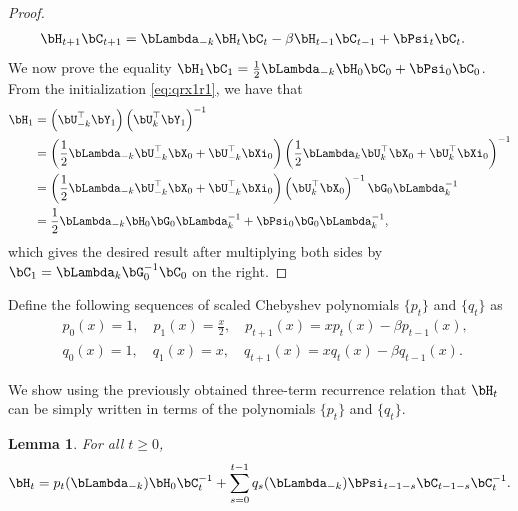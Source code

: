 \documentclass{article}
\theoremstyle{plain}
\newtheorem{lemma}[theorem]{Lemma}
\theoremstyle{definition}
\theoremstyle{remark}
\begin{document}
\begin{proof}
  \begin{align*}
    \bH_{t+1}\bC_{t+1} & = \bLambda_{-k} \bH_t \bC_t - \beta \bH_{t-1} \bC_{t-1} + \bPsi_t \bC_t.
  \end{align*}
  We now prove the equality $\bH_1\bC_1 = \frac{1}{2}\bLambda_{-k}\bH_0 \bC_0+ \bPsi_0 \bC_0$. From the initialization \eqref{eq:qrx1r1}, we have that
  \begin{align*}
    \bH_1 & = \left(\bU_{-k}^\top\bY_1\right) \left(\bU_k^\top \bY_1\right)^{-1} \\
    & = \left(\frac{1}{2}\bLambda_{-k}\bU_{-k}^\top\bX_0 + \bU_{-k}^\top\bXi_0\right) \left(\frac{1}{2}\bLambda_k \bU_k^\top\bX_0 + \bU_k^\top\bXi_0\right)^{-1} \\
    & = \left(\frac{1}{2}\bLambda_{-k}\bU_{-k}^\top\bX_0 + \bU_{-k}^\top\bXi_0\right) \left(\bU_k^\top\bX_0\right)^{-1} \bG_0 \bLambda_k^{-1} \\
    & = \frac{1}{2}\bLambda_{-k} \bH_0 \bG_0 \bLambda_k^{-1} + \bPsi_0 \bG_0 \bLambda_k^{-1},
  \end{align*}
  which gives the desired result after multiplying both sides by $\bC_1 = \bLambda_k \bG_0^{-1} \bC_0$ on the right.
\end{proof}

Define the following sequences of scaled Chebyshev polynomials $\{p_t\}$ and $\{q_t\}$ as
\begin{align}
  & p_0(x) = 1, \quad p_1(x) = \frac{x}{2}, \quad p_{t+1}(x) = x p_t(x) - \beta p_{t-1}(x), \label{eq:pt_def_appdx} \\
  & q_0(x) = 1, \quad q_1(x) = x, \quad q_{t+1}(x) = x q_t(x) - \beta q_{t-1}(x). \label{eq:qt_def_appdx}
\end{align}

We show using the previously obtained three-term recurrence relation that $\bH_t$ can be simply written in terms of the polynomials $\{p_t\}$ and $\{q_t\}$.

\begin{lemma}\label{lemma:htct}
  For all $t\geqslant 0$,
  \begin{align}\label{eq:ht_pq}
    \bH_t  = p_t(\bLambda_{-k}) \bH_0 \bC_t^{-1}+ \sum_{s=0}^{t-1} q_{s}(\bLambda_{-k}) \bPsi_{t-1-s} \bC_{t-1-s}\bC_t^{-1}.
  \end{align}
\end{lemma}
\end{document}

